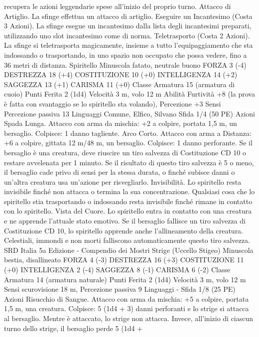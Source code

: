 \begin{multicols}{2}
recupera le azioni leggendarie spese all’inizio del proprio turno.
Attacco di Artiglio. La sfinge effettua un attacco di artiglio.
Eseguire un Incantesimo (Costa 3 Azioni). La sfinge esegue un
incantesimo dalla lista degli incantesimi preparati, utilizzando
uno slot incantesimo come di norma.
Teletrasporto (Costa 2 Azioni). La sfinge si teletrasporta
magicamente, insieme a tutto l’equipaggiamento che sta
indossando o trasportando, in uno spazio non occupato che possa
vedere, fino a 36 metri di distanza.
Spiritello
Minuscola fatato, neutrale buono
FORZA 3 (-4)
DESTREZZA 18 (+4)
COSTITUZIONE 10 (+0)
INTELLIGENZA 14 (+2)
SAGGEZZA 13 (+1)
CARISMA 11 (+0)
Classe Armatura 15 (armatura di cuoio)
Punti Ferita 2 (1d4)
Velocità 3 m, volo 12 m
Abilità Furtività +8 (la prova è fatta con svantaggio se lo
spiritello sta volando), Percezione +3
Sensi Percezione passiva 13
Linguaggi Comune, Elfico, Silvano
Sfida 1/4 (50 PE)
Azioni
Spada Lunga. Attacco con arma da mischia: +2 a colpire,
portata 1,5 m, un bersaglio.
Colpisce: 1 danno tagliente.
Arco Corto. Attacco con arma a Distanza: +6 a colpire, gittata
12 m/48 m, un bersaglio.
Colpisce: 1 danno perforante. Se il bersaglio è una creatura, deve
riuscire un tiro salvezza di Costituzione CD 10 o restare
avvelenata per 1 minuto. Se il risultato di questo tiro salvezza è 5
o meno, il bersaglio cade privo di sensi per la stessa durata, o
finché subisce danni o un’altra creatura usa un’azione per
risvegliarlo.
Invisibilità. Lo spiritello resta invisibile finché non attacca o
termina la sua concentrazione. Qualsiasi cosa che lo spiritello
stia trasportando o indossando resta invisibile finché rimane in
contatto con lo spiritello.
Vista del Cuore. Lo spiritello entra in contatto con una creatura e
ne apprende l’attuale stato emotivo. Se il bersaglio fallisce un
tiro salvezza di Costituzione CD 10, lo spiritello apprende anche
l’allineamento della creatura. Celestiali, immondi e non morti
falliscono automaticamente questo tiro salvezza.
SRD Italia 5a Edizione - Compendio dei Mostri
Strige (Uccello Stigeo)
Minuscola bestia, disallineato
FORZA 4 (-3)
DESTREZZA 16 (+3)
COSTITUZIONE 11 (+0)
INTELLIGENZA 2 (-4)
SAGGEZZA 8 (-1)
CARISMA 6 (-2)
Classe Armatura 14 (armatura naturale)
Punti Ferita 2 (1d4)
Velocità 3 m, volo 12 m
Sensi scurovisione 18 m, Percezione passiva 9
Linguaggi -
Sfida 1/8 (25 PE)
Azioni
Risucchio di Sangue. Attacco con arma da mischia: +5 a
colpire, portata 1,5 m, una creatura.
Colpisce: 5 (1d4 + 3) danni perforanti e lo strige si attacca al
bersaglio. Mentre è attaccato, lo strige non attacca. Invece,
all’inizio di ciascun turno dello strige, il bersaglio perde 5 (1d4 +

\end{multicols}
